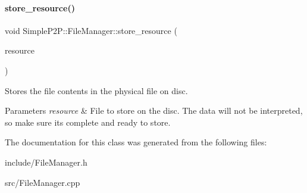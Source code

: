 \paragraph{\texorpdfstring{store\+\_\+resource()}{store\_resource()}}
{\footnotesize\ttfamily void Simple\+P2\+P\+::\+File\+Manager\+::store\+\_\+resource (\begin{DoxyParamCaption}\item[{Complete\+Resource \&}]{resource }\end{DoxyParamCaption})}



Stores the file contents in the physical file on disc. 


\begin{DoxyParams}{Parameters}
{\em resource} & File to store on the disc. The data will not be interpreted, so make sure it\textquotesingle{}s complete and ready to store. \\
\hline
\end{DoxyParams}


The documentation for this class was generated from the following files\+:\begin{DoxyCompactItemize}
\item 
include/File\+Manager.\+h\item 
src/File\+Manager.\+cpp\end{DoxyCompactItemize}
